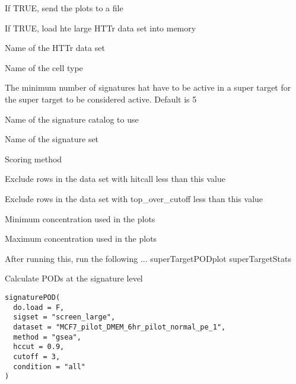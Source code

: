 \documentclass[letterpaper]{book}
\begin{document}
%
\begin{Arguments}
\begin{ldescription}
\item[\code{to.file}] If TRUE, send the plots to a file

\item[\code{do.load}] If TRUE, load hte large HTTr data set into memory

\item[\code{dataset}] Name of the HTTr data set

\item[\code{celltype}] Name of the cell type

\item[\code{cutoff}] The minimum number of signatures hat have to be active in a super
target for the super target to be considered active. Default is 5

\item[\code{sigcatalog}] Name of the signature catalog to use

\item[\code{sigset}] Name of the signature set

\item[\code{method}] Scoring method

\item[\code{hccut}] Exclude rows in the data set with hitcall less than this value

\item[\code{tccut}] Exclude rows in the data set with top\_over\_cutoff less than this value

\item[\code{minconc}] Minimum concentration used in the plots

\item[\code{maxconc}] Maximum concentration used in the plots

After running this, run the following ...
superTargetPODplot
superTargetStats
\end{ldescription}
\end{Arguments}
%
\begin{Description}\relax
Calculate PODs at the signature level
\end{Description}
%
\begin{Usage}
\begin{verbatim}
signaturePOD(
  do.load = F,
  sigset = "screen_large",
  dataset = "MCF7_pilot_DMEM_6hr_pilot_normal_pe_1",
  method = "gsea",
  hccut = 0.9,
  cutoff = 3,
  condition = "all"
)
\end{verbatim}
\end{Usage}
\end{document}
